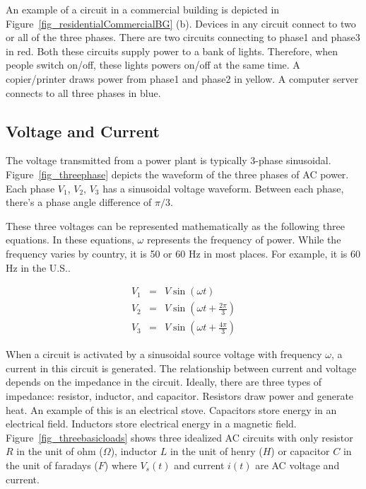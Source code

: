 An example of
a circuit in a commercial building is
depicted in Figure~\ref{fig_residentialCommercialBG} (b).
Devices in any circuit connect to two or all of 
the three phases. 
There are two circuits connecting to phase1 and phase3 in red.
Both these circuits supply power to a bank of lights.
Therefore, when people switch on/off,
these lights powers on/off at the same time.
A copier/printer draws power from phase1 and phase2 in yellow. 
A computer server connects to all three phases in blue.

\subsection{Voltage and Current}
The voltage transmitted from
a power plant is typically 3-phase sinusoidal.
Figure~\ref{fig_threephase} depicts the
waveform of the three phases of AC power.
Each phase $V_1$, $V_2$, $V_3$ has a sinusoidal
voltage waveform. Between each phase,
there's a phase angle difference of $\pi/3$.


These three voltages can be represented mathematically
as the following three equations.
In these equations,
$\omega$ represents the frequency of
power. While the frequency varies by country, it is 50 or 60 Hz in most 
places. For example, it is 60 Hz in the U.S..

\begin{eqnarray*}
\label{eq_sinusoidal}
V_1&=& V\sin(\omega t) \\
V_2&=& V\sin(\omega t + \frac{2\pi}{3}) \\
V_3&=& V\sin(\omega t+\frac{4\pi}{3})
\end{eqnarray*}

When a circuit is activated by a sinusoidal source voltage
with frequency $\omega$,
a current in this circuit is generated.
The relationship between current and voltage depends on
the impedance in the circuit.
Ideally, there are three types of impedance: resistor,
inductor, and capacitor.
Resistors draw power and generate heat.
An example of this is an electrical stove.
Capacitors store energy in an electrical field.
Inductors store electrical energy in a magnetic field.
Figure~\ref{fig_threebasicloads} shows three idealized AC circuits
with only resistor $R$ in the unit of ohm ($\Omega$), inductor $L$ in the unit of henry ($H$) or capacitor $C$ in the unit of faradays ($F$)
where $V_s(t)$ and current $i(t)$ are AC voltage and current.  


